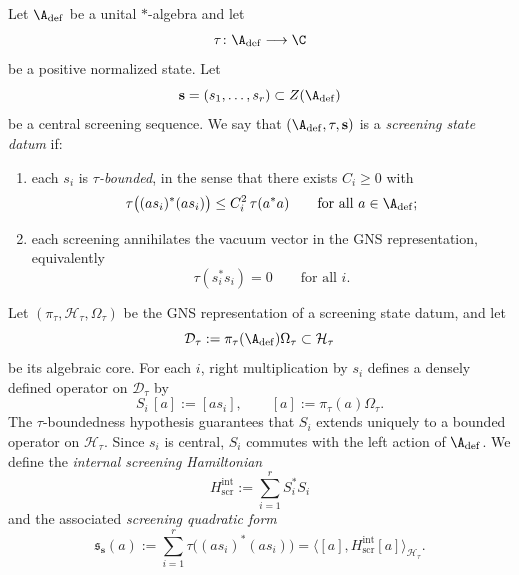 \begin{definition}
\label{def:screening-state-datum}
Let $\A_{\mathrm{def}}$ be a unital $*$-algebra and let
\[
\tau\colon \A_{\mathrm{def}}\longrightarrow \C
\]
be a positive normalized state.  Let
\[
\mathbf s=(s_1,\dots,s_r)\subset Z(\A_{\mathrm{def}})
\]
be a central screening sequence.
We say that $(\A_{\mathrm{def}},\tau,\mathbf s)$ is a \emph{screening state datum} if:
\begin{enumerate}[label=(\roman*)]
\item each $s_i$ is \emph{$\tau$-bounded}, in the sense that there exists $C_i\ge 0$ with
\[
\tau\bigl((a s_i)^*(a s_i)\bigr)\le C_i^2\,\tau(a^*a)
\qquad\text{for all }a\in \A_{\mathrm{def}};
\]
\item each screening annihilates the vacuum vector in the GNS representation, equivalently
\[
\tau(s_i^*s_i)=0
\qquad\text{for all }i.
\]
\end{enumerate}
\end{definition}

\begin{construction}
\label{constr:internal-screening-operators}
Let $(\pi_\tau,\mathcal H_\tau,\Omega_\tau)$ be the GNS representation of a screening state datum,
and let
\[
\mathcal D_\tau:=\pi_\tau(\A_{\mathrm{def}})\Omega_\tau\subset \mathcal H_\tau
\]
be its algebraic core.
For each $i$, right multiplication by $s_i$ defines a densely defined operator on $\mathcal D_\tau$ by
\[
S_i\,[a]:=[a s_i],
\qquad [a]:=\pi_\tau(a)\Omega_\tau.
\]
The $\tau$-boundedness hypothesis guarantees that $S_i$ extends uniquely to a bounded operator on $\mathcal H_\tau$.
Since $s_i$ is central, $S_i$ commutes with the left action of $\A_{\mathrm{def}}$.
We define the \emph{internal screening Hamiltonian}
\[
H_{\mathrm{scr}}^{\mathrm{int}}:=\sum_{i=1}^r S_i^*S_i
\]
and the associated \emph{screening quadratic form}
\[
\mathfrak s_{\mathbf s}(a):=\sum_{i=1}^r \tau\bigl((a s_i)^*(a s_i)\bigr)
=\bigl\langle [a],H_{\mathrm{scr}}^{\mathrm{int}}[a]\bigr\rangle_{\mathcal H_\tau}.
\]
\end{construction}

